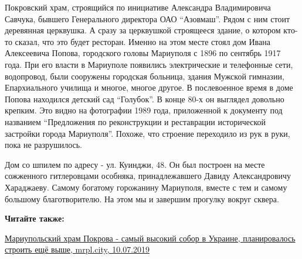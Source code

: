 Покровский храм, строящийся по инициативе Александра Владимировича Савчука,
бывшего Генерального директора ОАО \enquote{Азовмаш}. Рядом с ним стоит деревянная
церквушка. А сразу за церквушкой строящееся здание, о котором кто-то сказал,
что это будет ресторан. Именно на этом месте стоял дом Ивана Алексеевича
Попова, городского головы Мариуполя с 1896 по сентябрь 1917 года. При его
власти в Мариуполе появились электрические и телефонные сети, водопровод, были
сооружены городская больница, здания Мужской гимназии, Епархиального училища и
многое, многое другое. В послевоенное время в доме Попова находился детский сад
\enquote{Голубок}. В конце 80-х он выглядел довольно крепким. Это видно на фотографии
1989 года, приложенной к документу под названием \enquote{Предложения по реконструкции
и реставрации исторической застройки города Мариуполя}. Похоже, что строение
переходило из рук в руки, пока не разрушилось.

Дом со шпилем по адресу - ул. Куинджи, 48. Он был построен на месте сожженного
гитлеровцами особняка, принадлежавшего Давиду Александровичу Хараджаеву. Самому
богатому горожанину Мариуполя, вместе с тем и самому большому благотворителю.
На этом мы и завершим прогулку вокруг сквера.

\textbf{Читайте также:} 

\href{https://mrpl.city/news/view/mariupolskij-hram-pokrovasamyj-vysokij-sobor-v-ukraine-planirovalos-stroit-eshhjo-vyshe-foto}{%
Мариупольский храм Покрова - самый высокий собор в Украине, планировалось строить ещё выше, mrpl.city, 10.07.2019}

